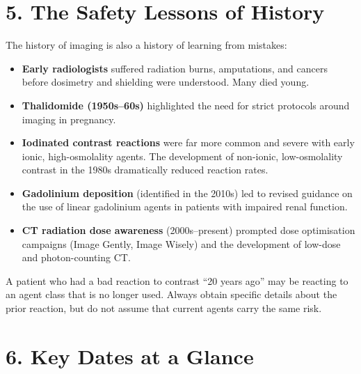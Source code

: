 \section*{5. The Safety Lessons of History}
The history of imaging is also a history of learning from mistakes:
\begin{itemize}
    \item \textbf{Early radiologists} suffered radiation burns, amputations, and cancers before dosimetry and shielding were understood. Many died young.
    \item \textbf{Thalidomide (1950s--60s)} highlighted the need for strict protocols around imaging in pregnancy.
    \item \textbf{Iodinated contrast reactions} were far more common and severe with early ionic, high-osmolality agents. The development of non-ionic, low-osmolality contrast in the 1980s dramatically reduced reaction rates.
    \item \textbf{Gadolinium deposition} (identified in the 2010s) led to revised guidance on the use of linear gadolinium agents in patients with impaired renal function.
    \item \textbf{CT radiation dose awareness} (2000s--present) prompted dose optimisation campaigns (Image Gently, Image Wisely) and the development of low-dose and photon-counting CT.
\end{itemize}

\begin{warnbox}
A patient who had a bad reaction to contrast ``20 years ago'' may be reacting to an agent class that is no longer used. Always obtain specific details about the prior reaction, but do not assume that current agents carry the same risk.
\end{warnbox}


\section*{6. Key Dates at a Glance}

